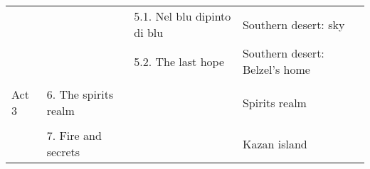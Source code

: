 \begin{longtable}[H]{|p{2cm}|p{3cm}|p{3cm}|p{3cm}|}
 & \multicolumn{1}{l|}{} & \multicolumn{1}{l|}{5.1. Nel blu dipinto di blu} & Southern desert: sky \\ \cline{3-4} 
 & \multicolumn{1}{l|}{} & \multicolumn{1}{l|}{5.2. The last hope} & Southern desert: Belzel's home \\ \hline
\multicolumn{4}{|l|}{} \\ \hline
\multicolumn{1}{|l|}{\cellcolor[HTML]{C0C0C0}Act 3} & \multicolumn{1}{l|}{6. The spirits realm} & \multicolumn{1}{l|}{} & Spirits realm \\ \hline
 & \multicolumn{3}{l|}{} \\ \cline{2-4} 
 & \multicolumn{1}{l|}{7. Fire and secrets} & \multicolumn{1}{l|}{} & Kazan island \\ \hline

\end{longtable}
\hspace{0pt} \\ %
